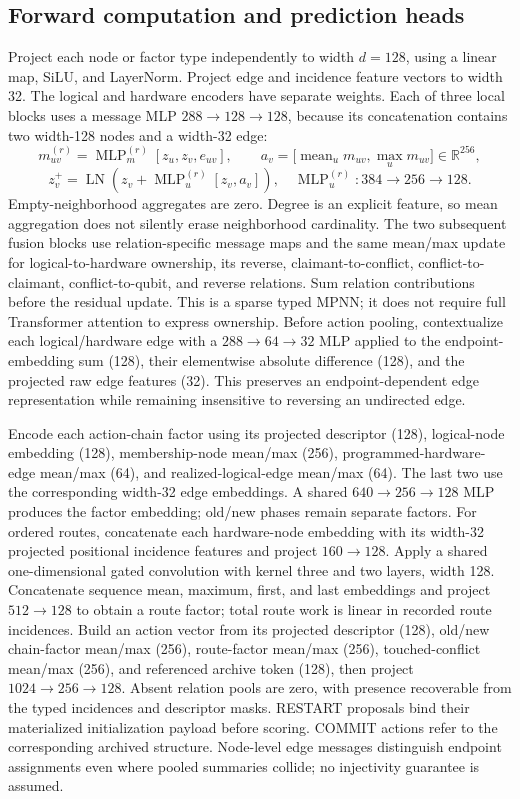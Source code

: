 \documentclass[11pt,a4paper]{article}
\theoremstyle{definition}\newtheorem{definition}[proposition]{Definition}
\begin{document}
\subsection{Forward computation and prediction heads}

Project each node or factor type independently to width \(d=128\), using a linear map, SiLU, and LayerNorm. Project edge and incidence feature vectors to width 32. The logical and hardware encoders have separate weights. Each of three local blocks uses a message MLP \(288\!\to\!128\!\to\!128\), because its concatenation contains two width-128 nodes and a width-32 edge:
\[
 m_{uv}^{(r)}=\operatorname{MLP}^{(r)}_m
 [z_u,z_v,e_{uv}],\qquad
 a_v=\bigl[\operatorname{mean}_{u}m_{uv},
             \operatorname{max}_{u}m_{uv}\bigr]\in\mathbb R^{256},
\]
\[
 z_v^+=\operatorname{LN}\!\left(z_v+
 \operatorname{MLP}^{(r)}_u[z_v,a_v]\right),
 \quad \operatorname{MLP}^{(r)}_u:384\to256\to128.
\]
Empty-neighborhood aggregates are zero. Degree is an explicit feature, so mean aggregation does not silently erase neighborhood cardinality. The two subsequent fusion blocks use relation-specific message maps and the same mean/max update for logical-to-hardware ownership, its reverse, claimant-to-conflict, conflict-to-claimant, conflict-to-qubit, and reverse relations. Sum relation contributions before the residual update. This is a sparse typed MPNN; it does not require full Transformer attention to express ownership. Before action pooling, contextualize each logical/hardware edge with a \(288\to64\to32\) MLP applied to the endpoint-embedding sum (128), their elementwise absolute difference (128), and the projected raw edge features (32). This preserves an endpoint-dependent edge representation while remaining insensitive to reversing an undirected edge.

Encode each action-chain factor using its projected descriptor (128), logical-node embedding (128), membership-node mean/max (256), programmed-hardware-edge mean/max (64), and realized-logical-edge mean/max (64). The last two use the corresponding width-32 edge embeddings. A shared \(640\to256\to128\) MLP produces the factor embedding; old/new phases remain separate factors. For ordered routes, concatenate each hardware-node embedding with its width-32 projected positional incidence features and project \(160\to128\). Apply a shared one-dimensional gated convolution with kernel three and two layers, width 128. Concatenate sequence mean, maximum, first, and last embeddings and project \(512\to128\) to obtain a route factor; total route work is linear in recorded route incidences. Build an action vector from its projected descriptor (128), old/new chain-factor mean/max (256), route-factor mean/max (256), touched-conflict mean/max (256), and referenced archive token (128), then project \(1024\to256\to128\). Absent relation pools are zero, with presence recoverable from the typed incidences and descriptor masks. RESTART proposals bind their materialized initialization payload before scoring. COMMIT actions refer to the corresponding archived structure. Node-level edge messages distinguish endpoint assignments even where pooled summaries collide; no injectivity guarantee is assumed.
\end{document}
